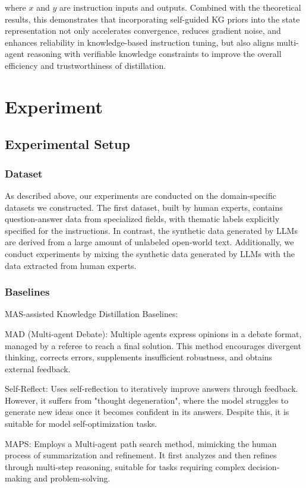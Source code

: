 \documentclass[preprint,12pt]{elsarticle}
\def\textbf#1{#1}%
\begin{document}
where $x$ and $y$ are instruction inputs and outputs. Combined with the theoretical results, this demonstrates that incorporating self-guided KG priors into the state representation not only accelerates convergence, reduces gradient noise, and enhances reliability in knowledge-based instruction tuning, but also aligns multi-agent reasoning with verifiable knowledge constraints to improve the overall efficiency and trustworthiness of distillation.

\section{Experiment}
\subsection{Experimental Setup}
\subsubsection{Dataset}
As described above, our experiments are conducted on the domain-specific datasets we constructed. The first dataset, built by human experts, contains question-answer data from specialized fields, with thematic labels explicitly specified for the instructions. In contrast, the synthetic data generated by LLMs are derived from a large amount of unlabeled open-world text. Additionally, we conduct experiments by mixing the synthetic data generated by LLMs with the data extracted from human experts.


\subsubsection{Baselines}
\textbf{MAS-assisted Knowledge Distillation Baselines:}
  
\textbf{MAD (Multi-agent Debate):} Multiple agents express opinions in a debate format, managed by a referee to reach a final solution. This method encourages divergent thinking, corrects errors, supplements insufficient robustness, and obtains external feedback.
    
\textbf{Self-Reflect:} Uses self-reflection to iteratively improve answers through feedback. However, it suffers from "thought degeneration", where the model struggles to generate new ideas once it becomes confident in its answers. Despite this, it is suitable for model self-optimization tasks.
      
\textbf{MAPS:} Employs a Multi-agent path search method, mimicking the human process of summarization and refinement. It first analyzes and then refines through multi-step reasoning, suitable for tasks requiring complex decision-making and problem-solving.
       
\end{document}
